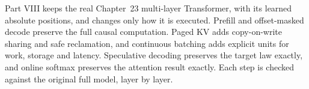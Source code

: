 Part VIII keeps the real Chapter~23 multi-layer Transformer, with its learned absolute positions, and changes only how it is executed. Prefill and offset-masked decode preserve the full causal computation. Paged KV adds copy-on-write sharing and safe reclamation, and continuous batching adds explicit units for work, storage and latency. Speculative decoding preserves the target law exactly, and online softmax preserves the attention result exactly. Each step is checked against the original full model, layer by layer.
